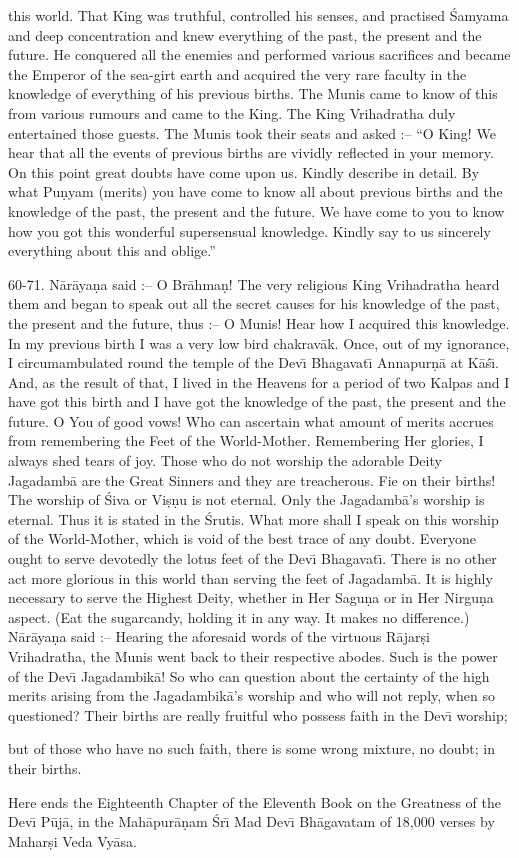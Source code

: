 this world. That King was truthful, controlled his senses, and practised \'Samyama and deep concentration and knew everything of the past, the present and the future. He conquered all the enemies and performed various sacrifices and became the Emperor of the sea-girt earth and acquired the very rare faculty in the knowledge of everything of his previous births. The Munis came to know of this from various rumours and came to the King. The King Vrihadratha duly entertained those guests. The Munis took their seats and asked :-- ``O King! We hear that all the events of previous births are vividly reflected in your memory. On this point great doubts have come upon us. Kindly describe in detail. By what Pu\d{n}yam (merits) you have come to know all about previous births and the knowledge of the past, the present and the future. We have come to you to know how you got this wonderful supersensual knowledge. Kindly say to us sincerely everything about this and oblige.''

60-71. N\=ar\=aya\d{n}a said :-- O Br\=ahma\d{n}! The very religious King Vrihadratha heard them and began to speak out all the secret causes for his knowledge of the past, the present and the future, thus :-- O Munis! Hear how I acquired this knowledge. In my previous birth I was a very low bird chakrav\=ak. Once, out of my ignorance, I circumambulated round the temple of the Dev\={\i} Bhagavat\={\i} Annapur\d{n}\=a at K\=a\'s\={\i}. And, as the result of that, I lived in the Heavens for a period of two Kalpas and I have got this birth and I have got the knowledge of the past, the present and the future. O You of good vows! Who can ascertain what amount of merits accrues from remembering the Feet of the World-Mother. Remembering Her glories, I always shed tears of joy. Those who do not worship the adorable Deity Jagadamb\=a are the Great Sinners and they are treacherous. Fie on their births! The worship of \'Siva or Vi\d{s}\d{n}u is not eternal. Only the Jagadamb\=a's worship is eternal. Thus it is stated in the \'Srutis. What more shall I speak on this worship of the World-Mother, which is void of the best trace of any doubt. Everyone ought to serve devotedly the lotus feet of the Dev\={\i} Bhagavat\={\i}. There is no other act more glorious in this world than serving the feet of Jagadamb\=a. It is highly necessary to serve the Highest Deity, whether in Her Sagu\d{n}a or in Her Nirgu\d{n}a aspect. (Eat the sugarcandy, holding it in any way. It makes no difference.) N\=ar\=aya\d{n}a said :-- Hearing the aforesaid words of the virtuous R\=ajar\d{s}i Vrihadratha, the Munis went back to their respective abodes. Such is the power of the Dev\={\i} Jagadambik\=a! So who can question about the certainty of the high merits arising from the Jagadambik\=a's worship and who will not reply, when so questioned? Their births are really fruitful who possess faith in the Dev\={\i} worship;

but of those who have no such faith, there is some wrong mixture, no doubt; in their births.

Here ends the Eighteenth Chapter of the Eleventh Book on the Greatness of the Dev\={\i} P\=uj\=a, in the Mah\=apur\=a\d{n}am \'Sr\={\i} Mad Dev\={\i} Bh\=agavatam of 18,000 verses by Mahar\d{s}i Veda Vy\=asa.



